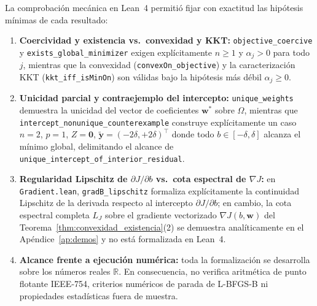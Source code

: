 La comprobación mecánica en Lean~4 permitió fijar con exactitud las hipótesis mínimas de cada resultado:
\begin{enumerate}
    \item \textbf{Coercividad y existencia vs.\ convexidad y KKT:} \texttt{objective\_coercive} y \texttt{exists\_global\_minimizer} exigen explícitamente $n \ge 1$ y $\alpha_j > 0$ para todo $j$, mientras que la convexidad (\texttt{convexOn\_objective}) y la caracterización KKT (\texttt{kkt\_iff\_isMinOn}) son válidas bajo la hipótesis más débil $\alpha_j \ge 0$.
    \item \textbf{Unicidad parcial y contraejemplo del intercepto:} \texttt{unique\_weights} demuestra la unicidad del vector de coeficientes $\mathbf{w}^*$ sobre $\Omega$, mientras que \texttt{intercept\_nonunique\_counterexample} construye explícitamente un caso $n=2$, $p=1$, $Z=\mathbf{0}$, $\tilde{\mathbf{y}}=(-2\delta, +2\delta)^\top$ donde todo $b \in [-\delta,\delta]$ alcanza el mínimo global, delimitando el alcance de \texttt{unique\_intercept\_of\_interior\_residual}.
    \item \textbf{Regularidad Lipschitz de $\partial J/\partial b$ vs.\ cota espectral de $\nabla J$:} en \texttt{Gradient.lean}, \texttt{gradB\_lipschitz} formaliza explícitamente la continuidad Lipschitz de la derivada respecto al intercepto $\partial J/\partial b$; en cambio, la cota espectral completa $L_J$ sobre el gradiente vectorizado $\nabla J(b,\mathbf{w})$ del Teorema~\ref{thm:convexidad_existencia}(2) se demuestra analíticamente en el Apéndice~\ref{ap:demos} y no está formalizada en Lean~4.
    \item \textbf{Alcance frente a ejecución numérica:} toda la formalización se desarrolla sobre los números reales $\mathbb{R}$. En consecuencia, no verifica aritmética de punto flotante IEEE-754, criterios numéricos de parada de L-BFGS-B ni propiedades estadísticas fuera de muestra.
\end{enumerate}
